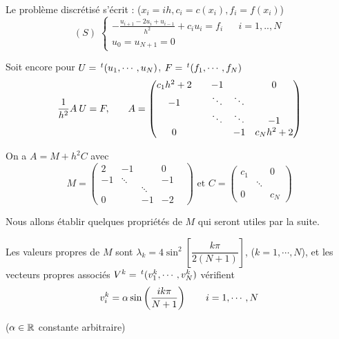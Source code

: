 Le problème discrétisé s'écrit : ($x_i = ih, c_i = c(x_i), f_i = f(x_i)$)
\[
    (S) \;
    \left\lbrace
    \begin{array}{ccc}
        -\frac{u_{i+1} - 2 u_i + u_{i-1}}{h^2} + c_i u_i = f_i & & i=1,..,N \\
        u_0=u_{N+1}=0
    \end{array}
    \right.
\]

Soit encore pour $U=\,^t(u_1,\cdots,u_N)$, $F = \,^t(f_1, \cdots,f_N)$
\[
    \begin{array}{ccc}
        \dfrac{1}{h^2}A \: U = F,
        & \hfill &
        A =
        \begin{pmatrix}
            c_1 h^2 + 2 & & -1 & & 0 \\
            -1 & & \ddots & \ddots & \\
            & & \ddots & \ddots & -1 \\
            0 & & & -1 & c_N h^2 + 2
        \end{pmatrix}
    \end{array}
\]

On a $A = M + h^2 C$ avec 
\[
    M = 
    \begin{pmatrix}
        2 & -1 & & 0 \\
        -1 & \ddots & & -1 \\
        & & \ddots & & \\
        0 & & -1 & -2
    \end{pmatrix}
    \text{ et } 
    C =
    \begin{pmatrix}
        c_1 & & 0 \\
        & \ddots & \\
        0 & & c_N
    \end{pmatrix}
\]

Nous allons établir quelques propriétés de $M$ qui seront utiles par la suite.

\begin{lemme}
    Les valeurs propres de $M$ sont $\lambda_k = 4 \sin^2 \left[ \dfrac{k\pi}{2(N+1)} \right]$, ($k=1,\cdots,N$), et les vecteurs propres associés
    $V^k = \,^t(v_1^k, \cdots , v_N^k)$ vérifient
    \[
        v_i^k = \alpha \sin \left( \frac{ik\pi}{N+1} \right) \hspace{0.7cm} i=1,\cdots,N
    \]

    ($\alpha \in \mathbb{R}$ constante arbitraire)
    \label{lemme:1-pbvp-lemme1}
\end{lemme}

